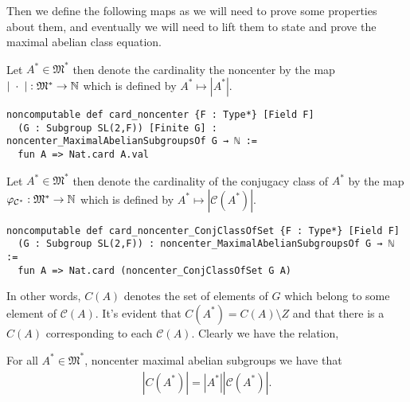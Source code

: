 Then we define the following maps as we will need to prove some properties about them, and eventually we will need to lift them to
state and prove the maximal abelian class equation.


\begin{definition}
  \label{card_noncenter}
  \leanok
  Let $A^* \in \mathfrak{M}^*$ then denote the cardinality the noncenter 
  by the map $| \; \cdot \; | : \mathfrak{M}^* \rightarrow \mathbb{N}$ which is defined by $A^* \mapsto |A^*|$.
\end{definition}
\begin{footnotesize}
\begin{verbatim}
noncomputable def card_noncenter {F : Type*} [Field F]
  (G : Subgroup SL(2,F)) [Finite G] : noncenter_MaximalAbelianSubgroupsOf G → ℕ :=
  fun A => Nat.card A.val
\end{verbatim}
\end{footnotesize}

\begin{definition}
  \label{card_noncenter_ConjClassOfSet}
  \leanok
  Let $A^* \in \mathfrak{M}^*$ then denote the cardinality of the conjugacy class of $A^*$
  by the map $\varphi_{\mathcal{C}^*} : \mathfrak{M}^* \rightarrow \mathbb{N}$  which is defined by $A^* \mapsto |\mathcal{C}(A^*)|$.
\end{definition}
\begin{footnotesize}
\begin{verbatim}
noncomputable def card_noncenter_ConjClassOfSet {F : Type*} [Field F]
  (G : Subgroup SL(2,F)) : noncenter_MaximalAbelianSubgroupsOf G → ℕ :=
  fun A => Nat.card (noncenter_ConjClassOfSet G A)
\end{verbatim}
\end{footnotesize}

In other words, $C(A)$ denotes the set of elements of $G$ which belong to some element of $\mathcal{C}(A)$. It's evident that $C(A^*) = C(A) \setminus Z$ and 
that there is a $C(A)$ corresponding to each $\mathcal{C}(A)$. Clearly we have the relation,
\begin{lemma}
\label{card_noncenter_C_eq_noncenter_MaximalAbelianSubgroup_mul_noncenter_ConjClassOfSet}
\leanok
For all $A^* \in \mathfrak{M}^*$, noncenter maximal abelian subgroups we have that
\begin{align} 
  |C(A^*)| = |A^*||\mathcal{C}(A^*)|.
\end{align}
\end{lemma}

